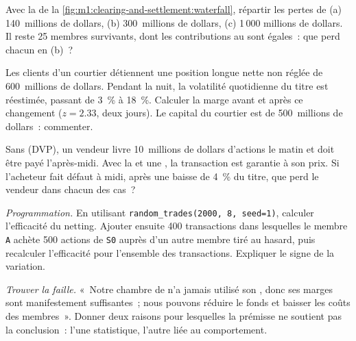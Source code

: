 \begin{exercise}[$\star\star$]\label{exo:m1:clearing-and-settlement:4}
Avec la  de la \cref{fig:m1:clearing-and-settlement:waterfall},
répartir les pertes de (a) 140~millions de dollars, (b) 300~millions de dollars, (c) 1\,000
millions de dollars. Il reste 25 membres survivants, dont les contributions au  sont égales~: que
perd chacun en (b)~?
\end{exercise}

\begin{exercise}[$\star\star$]\label{exo:m1:clearing-and-settlement:5}
Les clients d'un courtier détiennent une position longue nette non réglée de 600~millions de dollars.
Pendant la nuit, la volatilité quotidienne du titre est réestimée, passant de 3~\% à 18~\%.
Calculer la marge avant et après ce changement ($z = 2.33$, deux jours). Le
capital du courtier est de 500~millions de dollars~: commenter.
\end{exercise}

\begin{exercise}[$\star\star$]\label{exo:m1:clearing-and-settlement:6}
Sans  (DVP), un vendeur livre 10~millions de dollars d'actions le matin et doit
être payé l'après-midi. Avec la  et une , la transaction est garantie à
son prix. Si l'acheteur fait défaut à midi, après une baisse de 4~\% du titre, que
perd le vendeur dans chacun des cas~?
\end{exercise}

\begin{exercise}[$\star\star\star$]\label{exo:m1:clearing-and-settlement:7}
\emph{Programmation.} En utilisant \texttt{random\_trades(2000, 8, seed=1)}, calculer
l'efficacité du netting. Ajouter ensuite 400 transactions dans lesquelles le membre \texttt{A} achète
500 actions de \texttt{S0} auprès d'un autre membre tiré au hasard, puis recalculer
l'efficacité pour l'ensemble des transactions. Expliquer le signe de la variation.
\end{exercise}

\begin{exercise}[$\star\star\star$]\label{exo:m1:clearing-and-settlement:8}
\emph{Trouver la faille.} «~Notre chambre de  n'a jamais utilisé son ,
donc ses marges sont manifestement suffisantes~; nous pouvons réduire le fonds et baisser
les coûts des membres~». Donner deux raisons pour lesquelles la prémisse ne soutient pas la
conclusion~: l'une statistique, l'autre liée au comportement.
\end{exercise}

